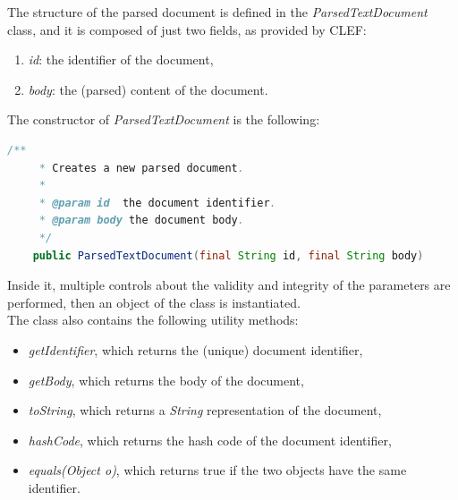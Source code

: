 The structure of the parsed document is defined in the \textit{ParsedTextDocument} class, and it is composed of just two fields, as provided by \ac{CLEF}:
\begin{enumerate}
\item \textit{id}: the identifier of the document,
\item \textit{body}: the (parsed) content of the document.
\end{enumerate}
The constructor of \textit{ParsedTextDocument} is the following:
\begin{lstlisting}[language=Java]
    /**
     * Creates a new parsed document.
     *
     * @param id  the document identifier.
     * @param body the document body.
     */
    public ParsedTextDocument(final String id, final String body) 
\end{lstlisting}
Inside it, multiple controls about the validity and integrity of the parameters are performed, then an object of the class is instantiated. \\
The class also contains the following utility methods:
\begin{itemize}
\item \textit{getIdentifier}, which returns the (unique) document identifier,
\item \textit{getBody}, which returns the body of the document,
\item \textit{toString}, which returns a \textit{String} representation of the document,
\item \textit{hashCode}, which returns the hash code of the document identifier,
\item \textit{equals(Object o)}, which returns true if the two objects have the same identifier.
\end{itemize}


